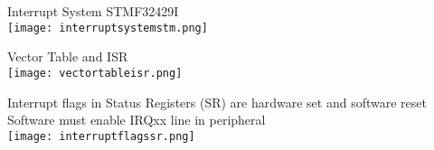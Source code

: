 \begin{definition}{Interrupt System STMF32429I}\\
    \texttt{[image: interruptsystemstm.png]}
\end{definition}

\begin{concept}{Vector Table and ISR}\\
    \texttt{[image: vectortableisr.png]}
\end{concept}

\begin{theorem}{Interrupt flags in Status Registers (SR)} are hardware set and software reset\\
    Software must enable IRQxx line in peripheral\\
    \texttt{[image: interruptflagssr.png]}
\end{theorem}

